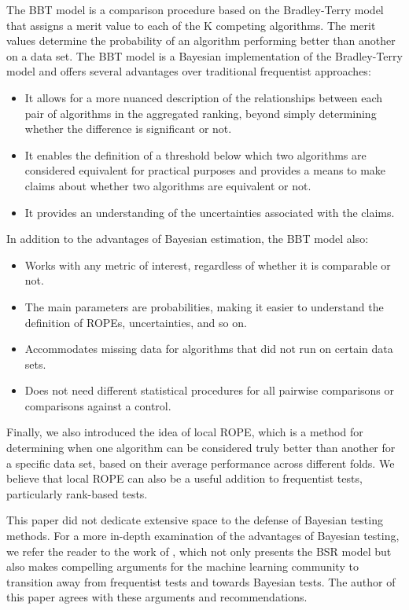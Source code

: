 \documentclass[twoside,11pt,preprint]{article}
\begin{document}
The BBT model is a comparison procedure based on the Bradley-Terry model that assigns a merit value to each of the K competing algorithms. The merit values determine the probability of an algorithm performing better than another on a data set. The BBT model is a Bayesian implementation of the Bradley-Terry model and offers several advantages over traditional frequentist approaches:

\begin{itemize}
\item
  It allows for a more nuanced description of the relationships between each pair of algorithms in the aggregated ranking, beyond simply determining whether the difference is significant or not.
\item
  It enables the definition of a threshold below which two algorithms are considered equivalent for practical purposes and provides a means to make claims about whether two algorithms are equivalent or not.
\item
  It provides an understanding of the uncertainties associated with the claims.
\end{itemize}

In addition to the advantages of Bayesian estimation, the BBT model also:

\begin{itemize}
\item
  Works with any metric of interest, regardless of whether it is comparable or not.
\item
  The main parameters are probabilities, making it easier to understand the definition of ROPEs, uncertainties, and so on.
\item
  Accommodates missing data for algorithms that did not run on certain data sets.
\item
  Does not need different statistical procedures for all pairwise comparisons or comparisons against a control.
\end{itemize}

Finally, we also introduced the idea of local ROPE, which is a method for determining when one algorithm can be considered truly better than another for a specific data set, based on their average performance across different folds. We believe that local ROPE can also be a useful addition to frequentist tests, particularly rank-based tests.

This paper did not dedicate extensive space to the defense of Bayesian testing methods. For a more in-depth examination of the advantages of Bayesian testing, we refer the reader to the work of \citet{benavoli2017time}, which not only presents the BSR model but also makes compelling arguments for the machine learning community to transition away from frequentist tests and towards Bayesian tests. The author of this paper agrees with these arguments and recommendations.
\end{document}
